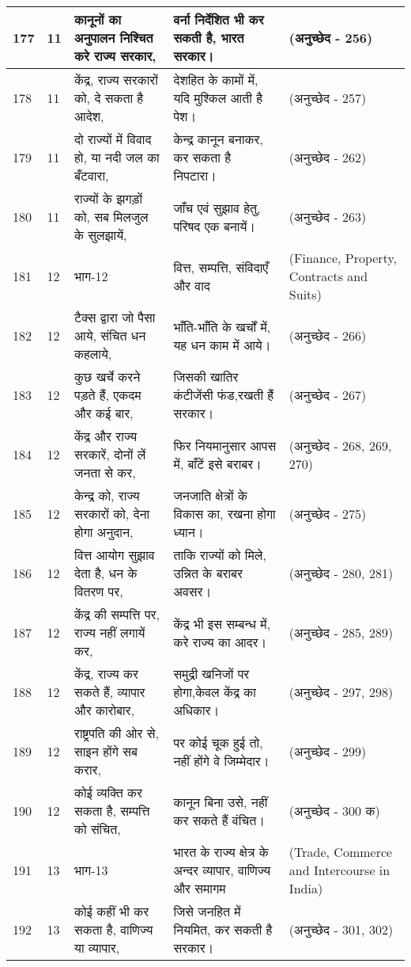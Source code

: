 \begin{longtable}{|l|l|l|l|l|}
177 & 11 & कानूनों का अनुपालन निश्चित करे राज्य सरकार, & वर्ना निर्देशित भी कर सकती है, भारत सरकार। & (अनुच्छेद - 256) \\ \hline 
178 & 11 & केंद्र, राज्य सरकारों को, दे सकता है आदेश, & देशहित के कामों में, यदि मुश्किल आती है पेश। & (अनुच्छेद - 257) \\ \hline 
179 & 11 & दो राज्यों में विवाद हो, या नदी जल का बँटवारा, & केन्द्र कानून बनाकर, कर सकता है निपटारा। & (अनुच्छेद - 262) \\ \hline 
180 & 11 & राज्यों के झगड़ों को, सब मिलजुल के सुलझायें, & जाँच एवं सुझाव हेतु, परिषद एक बनायें। & (अनुच्छेद - 263) \\ \hline 
181 & 12 & भाग-12 & वित्त, सम्पत्ति, संविदाएँ और वाद & (Finance, Property, Contracts and Suits) \\ \hline 
182 & 12 & टैक्स द्वारा जो पैसा आये, संचित धन कहलाये, & भाँति-भाँति के खर्चों में, यह धन काम में आये। & (अनुच्छेद - 266) \\ \hline 
183 & 12 & कुछ खर्चे करने पड़ते हैं, एकदम और कई बार, & जिसकी खातिर कंटीजेंसी फंड,रखती हैं सरकार। & (अनुच्छेद - 267) \\ \hline 
184 & 12 & केंद्र और राज्य सरकारें, दोनों लें जनता से कर, & फिर नियमानुसार आपस में, बाँटें इसे बराबर। & (अनुच्छेद - 268, 269, 270) \\ \hline 
185 & 12 & केन्द्र को, राज्य सरकारों को, देना होगा अनुदान, & जनजाति क्षेत्रों के विकास का, रखना होगा ध्यान। & (अनुच्छेद - 275) \\ \hline 
186 & 12 & वित्त आयोग सुझाव देता है, धन के वितरण पर, & ताकि राज्यों को मिले, उन्नित के बराबर अवसर। & (अनुच्छेद - 280, 281) \\ \hline 
187 & 12 & केंद्र की सम्पत्ति पर, राज्य नहीं लगायें कर, & केंद्र भी इस सम्बन्ध में, करे राज्य का आदर। & (अनुच्छेद - 285, 289) \\ \hline 
188 & 12 & केंद्र, राज्य कर सकते हैं, व्यापार और कारोबार, & समुद्री खनिजों पर होगा,केवल केंद्र का अधिकार। & (अनुच्छेद - 297, 298) \\ \hline 
189 & 12 & राष्ट्रपति की ओर से, साइन होंगे सब करार, & पर कोई चूक हुई तो, नहीं होंगे वे जिम्मेदार। & (अनुच्छेद - 299) \\ \hline 
190 & 12 & कोई व्यक्ति कर सकता है, सम्पत्ति को संचित, & कानून बिना उसे, नहीं कर सकते हैं वंचित। & (अनुच्छेद - 300 क) \\ \hline 
191 & 13 & भाग-13 & भारत के राज्य क्षेत्र के अन्दर व्यापार, वाणिज्य और समागम & (Trade, Commerce and Intercourse in India) \\ \hline 
192 & 13 & कोई कहीं भी कर सकता है, वाणिज्य या व्यापार, & जिसे जनहित में नियमित, कर सकती है सरकार। & (अनुच्छेद - 301, 302) \\ \hline 

\end{longtable}
